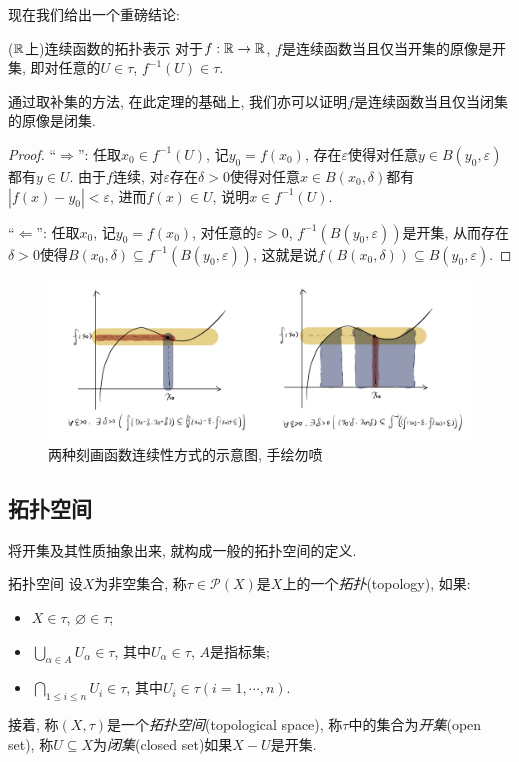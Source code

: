 现在我们给出一个重磅结论: 

\begin{theorem}{($\mathbb{R}$上)连续函数的拓扑表示}
	对于$f:\mathbb{R} \to \mathbb{R}$, $f$是连续函数当且仅当开集的原像是开集, 即对任意的$U\in \tau$, $f^{-1}(U) \in \tau$. 
\end{theorem}
\begin{remark}
	通过取补集的方法, 在此定理的基础上, 我们亦可以证明$f$是连续函数当且仅当闭集的原像是闭集. 
\end{remark}
\begin{proof}
	“$\Rightarrow$”: 任取$x_0 \in f^{-1}(U)$, 记$y_0=f(x_0)$, 存在$\varepsilon$使得对任意$y \in B(y_0,\varepsilon)$都有$y \in U$. 由于$f$连续, 对$\varepsilon$存在$\delta >0$使得对任意$x \in B(x_0,\delta)$都有$|f(x)-y_0|<\varepsilon$, 进而$f(x) \in U$, 说明$x \in f^{-1}(U)$. 
	
	“$\Leftarrow$”: 任取$x_0$, 记$y_0=f(x_0)$, 对任意的$\varepsilon >0$, $f^{-1}(B(y_0, \varepsilon))$是开集, 从而存在$\delta >0$使得$B(x_0,\delta) \subseteq f^{-1}(B(y_0, \varepsilon))$, 这就是说$f(B(x_0,\delta)) \subseteq B(y_0, \varepsilon)$. 
\end{proof}

\begin{figure}[H]
	\centering
	\includegraphics[width=16cm]{attachment/IMG_3539.jpg}
	\caption{两种刻画函数连续性方式的示意图, 手绘勿喷}
\end{figure}

\subsection{拓扑空间}

将开集及其性质抽象出来, 就构成一般的拓扑空间的定义. 

\begin{definition}{拓扑空间}
	设$X$为非空集合, 称$\tau \in \mathcal{P}(X)$是$X$上的一个\textit{拓扑}(topology), 如果: 
	\begin{itemize}
		\item $X \in \tau$, $\varnothing \in \tau$; 
		\item $\bigcup_{\alpha \in A} U_{\alpha} \in \tau$, 其中$U_{\alpha} \in \tau$, $A$是指标集; 
		\item $\bigcap_{1 \leq i \leq n} U_i \in \tau$, 其中$U_i \in \tau(i=1,\cdots ,n)$. 
	\end{itemize}
	接着, 称$(X,\tau)$是一个\textit{拓扑空间}(topological space), 称$\tau$中的集合为\textit{开集}(open set), 称$U \subseteq X$为\textit{闭集}(closed set)如果$X - U$是开集. 
\end{definition}

